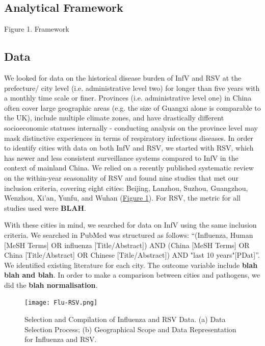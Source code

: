 \documentclass{article}
\begin{document}
\subsection{Analytical Framework }
Figure 1. Framework

\subsection{Data}
We looked for data on the historical disease burden of InfV and RSV at the prefecture/ city level (i.e. administrative level two) for longer than five years with a monthly time scale or finer. Provinces (i.e. administrative level one) in China often cover large geographic areas (e.g. the size of Guangxi alone is comparable to the UK), include multiple climate zones, and have drastically different socioeconomic statuses internally - conducting analysis on the province level may mask distinctive experiences in terms of respiratory infectious diseases. In order to identify cities with data on both InfV and RSV, we started with RSV, which has newer and less consistent surveillance systems compared to InfV in the context of mainland China. We relied on a recently published systematic review on the within-year seasonality of RSV \cite{guo2024respiratory} and found nine studies that met our inclusion criteria, covering eight cities: Beijing, Lanzhou, Suzhou, Guangzhou, Wenzhou, Xi'an, Yunfu, and Wuhan (\hyperref[fig_1]{Figure 1}). For RSV, the metric for all studies used were \textbf{BLAH}.

With these cities in mind, we searched for data on InfV using the same inclusion criteria. We searched in PubMed was structured as follows: “(Influenza, Human [MeSH Terms] OR influenza [Title/Abstract]) AND (China [MeSH Terms] OR China [Title/Abstract] OR Chinese [Title/Abstract]) AND "last 10 years"[PDat]”. We identified existing literature for each city. The outcome variable include \textbf{blah blah and blah}. In order to make a comparison between cities and pathogens, we did the \textbf{blah normalisation}.

\begin{figure}[htbp]
  \centering
  \texttt{[image: Flu-RSV.png]}
  \caption{Selection and Compilation of Influenza and RSV Data. (a) Data Selection Process; (b) Geographical Scope and Data Representation for Influenza and RSV.}
  \label{fig_1_bak}
\end{figure}
\end{document}
